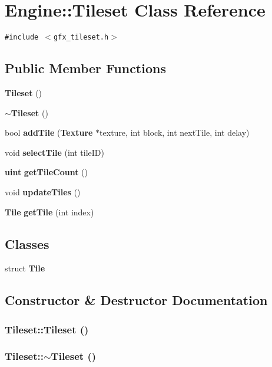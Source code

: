 \section{Engine::Tileset Class Reference}
\label{classEngine_1_1Tileset}
{\tt \#include $<$gfx\_\-tileset.h$>$}

\subsection*{Public Member Functions}
\begin{CompactItemize}
\item 
{\bf Tileset} ()
\item 
{\bf $\sim$Tileset} ()
\item 
bool {\bf addTile} ({\bf Texture} $\ast$texture, int block, int nextTile, int delay)
\item 
void {\bf selectTile} (int tileID)
\item 
{\bf uint} {\bf getTileCount} ()
\item 
void {\bf updateTiles} ()
\item 
{\bf Tile} {\bf getTile} (int index)
\end{CompactItemize}
\subsection*{Classes}
\begin{CompactItemize}
\item 
struct {\bf Tile}
\end{CompactItemize}


\subsection{Constructor \& Destructor Documentation}
\subsubsection{\setlength{\rightskip}{0pt plus 5cm}Tileset::Tileset ()}\label{classEngine_1_1Tileset_9b75b605d834e3c9e25fb1c2429a36f6}


\subsubsection{\setlength{\rightskip}{0pt plus 5cm}Tileset::$\sim$Tileset ()}\label{classEngine_1_1Tileset_fbb53f34f87b8b9c1f575349e89a6cd5}




